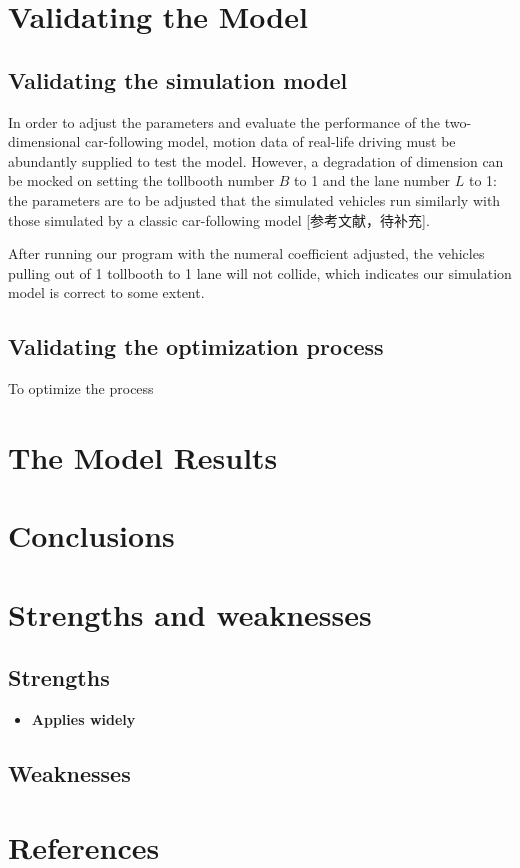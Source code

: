 \documentclass{mcmthesis}
\begin{document}
\section{Validating the Model}

\subsection{Validating the simulation model}

In order to adjust the parameters and evaluate the performance of the two-dimensional car-following model, motion data of real-life driving must be abundantly supplied to test the model. However, a degradation of dimension can be mocked on setting the tollbooth number $B$ to 1 and the lane number $L$ to 1: the parameters are to be adjusted that the simulated vehicles run similarly with those simulated by a classic car-following model [参考文献，待补充].

After running our program with the numeral coefficient adjusted, the vehicles pulling out of 1 tollbooth to 1 lane will not collide, which indicates our simulation model is correct to some extent.

\subsection{Validating the optimization process}

To optimize the process


\section{The Model Results}




\section{Conclusions}


\section{Strengths and weaknesses}


\subsection{Strengths}
\begin{itemize}
\item \textbf{Applies widely}\\


\end{itemize}
\subsection{Weaknesses}

\begin{appendices}



\end{appendices}


\section{References}
\nocite{*}



	
\end{document}
